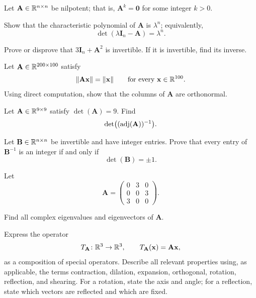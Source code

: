 \begin{problem}
Let $\mathbf A\in\mathbb{R}^{n\times n}$ be nilpotent; that is, $\mathbf A^k=\mathbf0$ for some integer $k>0$.
\begin{problemsubparts}
\item Show that the characteristic polynomial of $\mathbf A$ is $\lambda^n$; equivalently,
\[
\det(\lambda\mathbf I_n-\mathbf A)=\lambda^n.
\]
\item Prove or disprove that $3\mathbf I_n+\mathbf A^2$ is invertible. If it is invertible, find its inverse.
\end{problemsubparts}
\end{problem}

\begin{problem}
Let $\mathbf A\in\mathbb{R}^{200\times100}$ satisfy
\[
\|\mathbf A\mathbf x\|=\|\mathbf x\|
\qquad\text{for every }\mathbf x\in\mathbb{R}^{100}.
\]
Using direct computation, show that the columns of $\mathbf A$ are orthonormal.
\end{problem}

\begin{problem}
\begin{problemsubparts}
\item Let $\mathbf A\in\mathbb{R}^{9\times9}$ satisfy $\det(\mathbf A)=9$. Find
\[
\det\bigl((\operatorname{adj}(\mathbf A))^{-1}\bigr).
\]
\item Let $\mathbf B\in\mathbb{R}^{n\times n}$ be invertible and have integer entries. Prove that every entry of $\mathbf B^{-1}$ is an integer if and only if
\[
\det(\mathbf B)=\pm1.
\]
\end{problemsubparts}
\end{problem}

\begin{problem}
Let
\[
\mathbf A=
\begin{pmatrix}
0&3&0\\
0&0&3\\
3&0&0
\end{pmatrix}.
\]
\begin{problemsubparts}
\item Find all complex eigenvalues and eigenvectors of $\mathbf A$.
\item Express the operator
\[
T_{\mathbf A}\colon\mathbb{R}^3\to\mathbb{R}^3,
\qquad
T_{\mathbf A}(\mathbf x)=\mathbf A\mathbf x,
\]
as a composition of special operators. Describe all relevant properties using, as applicable, the terms contraction, dilation, expansion, orthogonal, rotation, reflection, and shearing. For a rotation, state the axis and angle; for a reflection, state which vectors are reflected and which are fixed.
\end{problemsubparts}
\end{problem}

